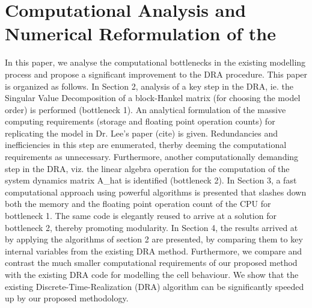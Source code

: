 
\chapter{Computational Analysis and Numerical Reformulation of the }\label{ch:improveddra}
\startcontents[chapters]

\bigskip


In  this  paper,  we  analyse  the computational  bottlenecks  in  the  existing
modelling process  and propose a  significant improvement to the  DRA procedure.
This paper is organized as follows. In Section  2, analysis of a key step in the
DRA, ie. the Singular Value Decomposition of a block-Hankel matrix (for choosing
the model order)  is performed (bottleneck 1). An analytical  formulation of the
massive computing requirements (storage and floating point operation counts) for
replicating  the model  in Dr.  Lee's paper  (cite) is  given. Redundancies  and
inefficiencies in  this step  are enumerated,  therby deeming  the computational
requirements as unnecessary. Furthermore, another computationally demanding step
in the DRA, viz. the linear algebra  operation for the computation of the system
dynamics  matrix A\_hat  is  identified (bottleneck  2). In  Section  3, a  fast
computational approach using powerful algorithms  is presented that slashes down
both the memory and the floating point operation count of the CPU for bottleneck
1. The same code  is elegantly reused to arrive at a  solution for bottleneck 2,
thereby promoting modularity.  In Section 4, the results arrived  at by applying
the algorithms  of section 2  are presented, by  comparing them to  key internal
variables from the existing DRA method. Furthermore, we compare and contrast the
much  smaller  computational  requirements  of  our  proposed  method  with  the
existing DRA  code for modelling the  cell behaviour. We show  that the existing
Discrete-Time-Realization (DRA) algorithm can be significantly speeded up by our
proposed methodology.



